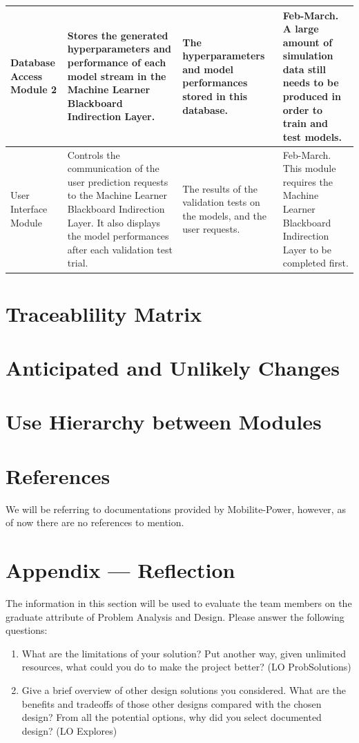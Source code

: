 \documentclass[12pt, titlepage]{article}
\begin{document}
\begin{longtable}{|p{2cm}|p{3cm}|p{3cm}|p{3cm}}
    \hline 
    Database Access Module 2 & Stores the generated hyperparameters and performance of each model stream in the Machine Learner Blackboard Indirection Layer. & The hyperparameters and model performances stored in this database. & Feb-March. A large amount of simulation data still needs to be produced in order to train and test models.\\
    \hline 
    User Interface Module & Controls the communication of the user prediction requests to the Machine Learner Blackboard Indirection Layer. It also displays the model performances after each validation test trial. & The results of the validation tests on the models, and the user requests. & Feb-March. This module requires the Machine Learner Blackboard Indirection Layer to be completed first. \\
    \hline 
\end{longtable}
  

\section{Traceablility Matrix}

\section{Anticipated and Unlikely Changes}

\section{Use Hierarchy between Modules}

\section*{References}
We will be referring to documentations provided by Mobilite-Power, however, as of now there are no references to mention.





\newpage

\newpage{}
\section*{Appendix --- Reflection}

The information in this section will be used to evaluate the team members on the graduate attribute of Problem Analysis and Design. Please answer the following questions: 
\par 
\begin{enumerate}
  \item What are the limitations of your solution? Put another way, given unlimited resources, what could you do to make the project better? (LO ProbSolutions) 
  \item Give a brief overview of other design solutions you considered. What are the benefits and tradeoffs of those other designs compared with the chosen design? From all the potential options, why did you select documented design? (LO Explores)
\end{enumerate}
\end{document}
